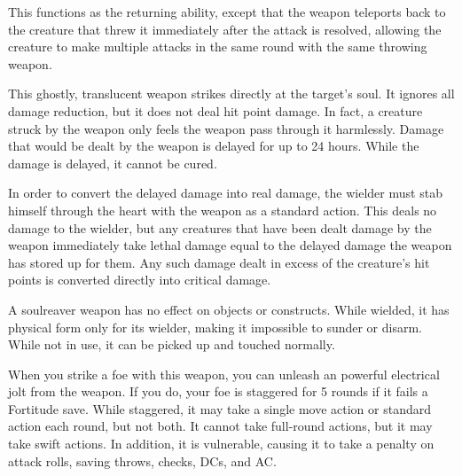 
 This functions as the returning ability, except that the weapon teleports back to the creature that threw it immediately after the attack is resolved, allowing the creature to make multiple attacks in the same round with the same throwing weapon. 


 This ghostly, translucent weapon strikes directly at the target's soul. It ignores all damage reduction, but it does not deal hit point damage. In fact, a creature struck by the weapon only feels the weapon pass through it harmlessly. Damage that would be dealt by the weapon is delayed for up to 24 hours. While the damage is delayed, it cannot be cured.

In order to convert the delayed damage into real damage, the wielder must stab himself through the heart with the weapon as a standard action. This deals no damage to the wielder, but any creatures that have been dealt damage by the weapon immediately take lethal damage equal to the delayed damage the weapon has stored up for them. Any such damage dealt in excess of the creature's hit points is converted directly into critical damage.

A soulreaver weapon has no effect on objects or constructs. While wielded, it has physical form only for its wielder, making it impossible to sunder or disarm. While not in use, it can be picked up and touched normally.


 When you strike a foe with this weapon, you can unleash an powerful electrical jolt from the weapon. If you do, your foe is staggered for 5 rounds if it fails a Fortitude save. While staggered, it may take a single move action or standard action each round, but not both. It cannot take full-round actions, but it may take swift actions. In addition, it is vulnerable, causing it to take a  penalty on attack rolls, saving throws, checks, DCs, and AC.

